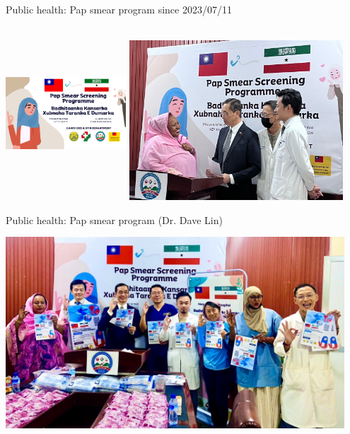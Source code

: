 \documentclass[aspectratio=169]{beamer}
\begin{document}
\begin{frame}{Public health: Pap smear program since 2023/07/11}
    \begin{center}
        \includegraphics[width=4.5cm, height=6.5cm]{IMG-5434.JPG} 
        \includegraphics[width=0.6\textwidth]{IMG-5436.JPG}
    \end{center}
\end{frame}


\begin{frame}{Public health: Pap smear program (Dr. Dave Lin)}
    \begin{center}
%        
        \includegraphics[width=0.95\textwidth]{IMG-5437.JPG}
    \end{center}
\end{frame}
\end{document}
